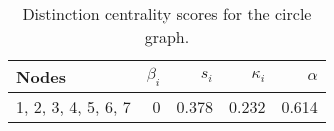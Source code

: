 \begin{table}
\centering
\caption{\label{tab:circle}Distinction centrality scores for the circle graph.}
\centering
\begin{tabular}[t]{lrrrr}
\toprule
Nodes & $\beta_i$ & $s_i$ & $\kappa_i$ & $\alpha$\\
\midrule
1, 2, 3, 4, 5, 6, 7 & 0 & 0.378 & 0.232 & 0.614\\
\bottomrule
\end{tabular}
\end{table}
